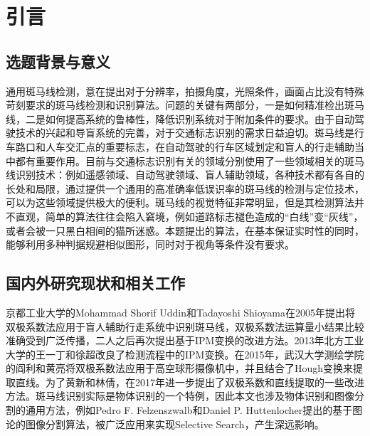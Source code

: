 
\chapter{引言}
\label{cha:introduction}
\section{选题背景与意义}
\label{sec:background}

通用斑马线检测，意在提出对于分辨率，拍摄角度，光照条件，画面占比没有特殊苛刻要求的斑马线检测和识别算法。问题的关键有两部分，一是如何精准检出斑马线，二是如何提高系统的鲁棒性，降低识别系统对于附加条件的要求。由于自动驾驶技术的兴起和导盲系统的完善，对于交通标志识别的需求日益迫切。斑马线是行车路口和人车交汇点的重要标志，在自动驾驶的行车区域划定和盲人的行走辅助当中都有重要作用。目前与交通标志识别有关的领域分别使用了一些领域相关的斑马线识别技术：例如遥感领域、自动驾驶领域、盲人辅助领域，各种技术都有各自的长处和局限，通过提供一个通用的高准确率低误识率的斑马线的检测与定位技术，可以为这些领域提供极大的便利。斑马线的视觉特征非常明显，但是其检测算法并不直观，简单的算法往往会陷入窘境，例如道路标志褪色造成的“白线”变“灰线”，或者会被一只黑白相间的猫所迷惑。本题提出的算法，在基本保证实时性的同时，能够利用多种判据规避相似图形，同时对于视角等条件没有要求。


\section{国内外研究现状和相关工作}
\label{sec:related_work}
京都工业大学的Mohammad Shorif Uddin和Tadayoshi Shioyama在2005年提出将双极系数法\cite{bipolar}应用于盲人辅助行走系统中识别斑马线，双极系数法运算量小结果比较准确受到广泛传播，二人之后再次提出基于IPM变换的改进方法。2013年北方工业大学的王一丁和徐超改良了检测流程中的IPM变换\cite{ipm}。在2015年，武汉大学测绘学院的阎利和黄亮将双极系数法应用于高空球形摄像机中，并且结合了Hough变换来提取直线。为了黄新和林倩，在2017年进一步提出了双极系数和直线提取的一些改进方法。斑马线识别实际是物体识别的一个特例，因此本文也涉及物体识别和图像分割的通用方法，例如Pedro F. Felzenszwalb和Daniel P. Huttenlocher提出的基于图论的图像分割算法\cite{segmentation}，被广泛应用来实现Selective Search，产生深远影响。

